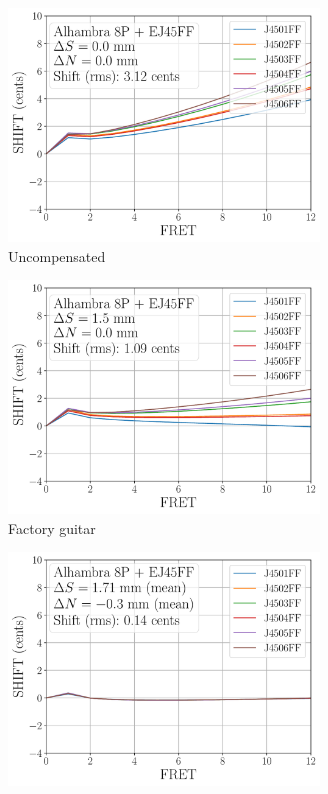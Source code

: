  \begin{figure}
   \centering
   \begin{subfigure}[b]{0.46\textwidth}
    \centering
    \includegraphics[width=3.25in]{../figures/shift_alhambra8p_ej45ff_null}
    \caption{Uncompensated}
    \label{fig:shift_alhambra8p_ej45ff_null}
   \end{subfigure}
   \hspace{0.25in}
   \begin{subfigure}[b]{0.46\textwidth}
    \centering
    \includegraphics[width=3.25in]{../figures/shift_alhambra8p_ej45ff_factory}
    \caption{Factory guitar}
    \label{fig:shift_alhambra8p_ej45ff_factory}
   \end{subfigure}
   \par\vspace{0.25in}
   \begin{subfigure}[b]{0.46\textwidth}
    \centering
    \includegraphics[width=3.25in]{../figures/shift_alhambra8p_ej45ff_full}

\end{subfigure}
\end{figure}

